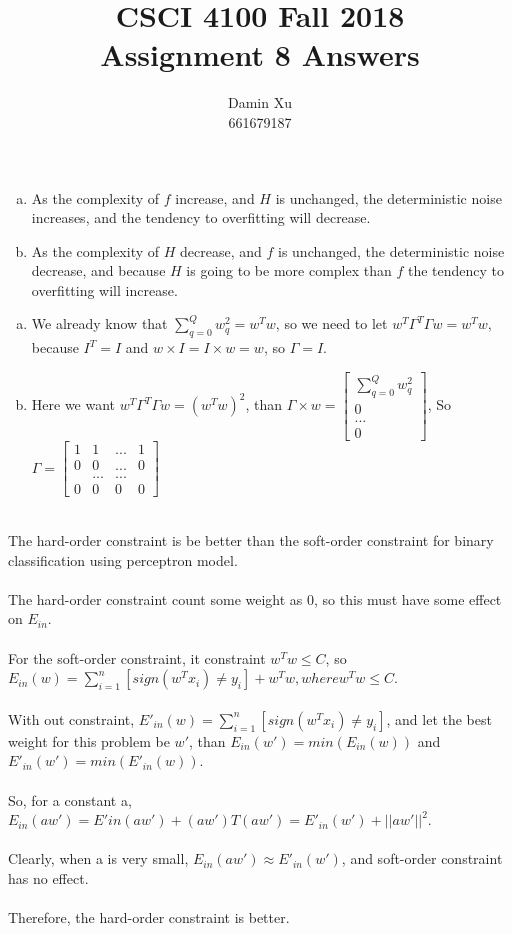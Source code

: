 \documentclass[11pt]{article}
\title{CSCI 4100 Fall 2018 \\
Assignment 8 Answers}
\author{Damin Xu\\661679187}
\begin{document}
\maketitle
\begin{enumerate} [(a)]
	\item As the complexity of $f$ increase, and $H$ is unchanged, the deterministic noise increases, and the tendency to overfitting will decrease.

	\item As the complexity of $H$ decrease, and $f$ is unchanged, the deterministic noise decrease, and because $H$ is going to be more complex than $f$ the tendency to overfitting will increase.
\end{enumerate}
\newpage

\begin{enumerate} [(a)]
	\item We already know that $\sum^{Q}_{q=0}w^2_q=w^Tw$, so we need to let $w^T\Gamma^T\Gamma w = w^Tw$, because $I^T=I$ and $w\times I= I\times w =w$, so $\Gamma = I$.

	\item Here we want $w^T\Gamma^T\Gamma w = (w^Tw)^2$, than $\Gamma \times w = \begin{bmatrix}
\sum^{Q}_{q=0}w^2_q \\
0 \\
... \\
0 
\end{bmatrix}$, So $\Gamma=\begin{bmatrix}
1 & 1 & ... & 1 \\
0 & 0 & ... & 0 \\
 & ... & ... &  \\
0 & 0 & 0 & 0 
\end{bmatrix}$
\end{enumerate}
\newpage
{} \ \\
The hard-order constraint is be better than the soft-order constraint for binary classification using perceptron model.\\\\

The hard-order constraint count some weight as 0, so this must have some effect on $E_{in}$.\\\\
For the soft-order constraint, it constraint $w^Tw\leq C$, so $E_{in}(w)=\sum^n_{i=1}[sign(w^Tx_i)\neq y_i]+w^Tw, where w^Tw\leq C$.\\\\
With out constraint, $E'_{in}(w)=\sum^n_{i=1}[sign(w^Tx_i)\neq y_i]$, and let the best weight for this problem be $w'$, than $E_{in}(w')=min(E_{in}(w))$ and $E'_{in}(w')=min(E'_{in}(w))$.\\\\
So, for a constant a, $E_{in}(aw')=E'{in}(aw')+(aw')T(aw') = E'_{in}(w')+||aw'||^2$.\\\\
Clearly, when a is very small, $E_{in}(aw')\approx E'_{in}(w')$, and soft-order constraint has no effect.\\\\
Therefore, the hard-order constraint is better.
\end{document}
